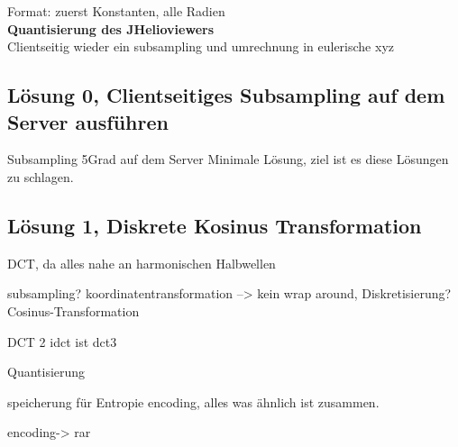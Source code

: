 Format: zuerst Konstanten, alle Radien\\
[\baselineskip]
\textbf{Quantisierung des JHelioviewers}\\
Clientseitig wieder ein subsampling und umrechnung in eulerische xyz
	
\subsection{Lösung 0, Clientseitiges Subsampling auf dem Server ausführen}
Subsampling 5Grad auf dem Server
Minimale Lösung, ziel ist es diese Lösungen zu schlagen.

\subsection{Lösung 1, Diskrete Kosinus Transformation}
DCT, da alles nahe an harmonischen Halbwellen

subsampling?
koordinatentransformation --> kein wrap around, 
Diskretisierung?
Cosinus-Transformation

DCT 2
idct ist dct3

Quantisierung

speicherung für Entropie encoding, alles was ähnlich ist zusammen.

encoding-> rar



